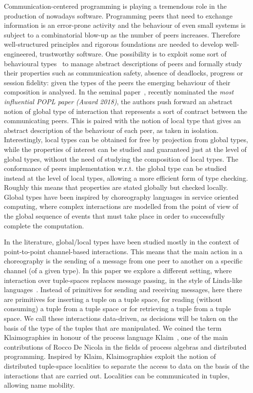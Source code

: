 
Communication-centered programming is playing a tremendous role in the production of nowadays software. Programming peers that need to exchange information is an error-prone activity and the behaviour of even small systems is subject to a combinatorial blow-up as the number of peers increases.
Therefore well-structured principles and rigorous foundations are needed to develop well-engineered, trustworthy software. 
One possibility is to exploit some sort of behavioural types~\cite{DBLP:journals/csur/HuttelLVCCDMPRT16,dd09} to manage abstract descriptions of peers and formally study their properties such as communication safety, absence of deadlocks, progress or session fidelity: given the types of the peers the emerging behaviour of their composition is analysed.
In the seminal paper~\cite{DBLP:conf/popl/HondaYC08}, recently nominated the \emph{most influential POPL paper (Award 2018)}, the authors push forward an abstract notion of global type of interaction that represents a sort of contract between the communicating peers. This is paired with the notion of local type that gives an abstract description of the behaviour of each peer, as taken in isolation.
Interestingly, local types can be obtained for free by projection from global types, while the properties of interest can be studied and guaranteed just at the level of global types, without the need of studying the composition of local types. The conformance of peers implementation w.r.t. the global type can be studied instead at the level of local types, allowing a more efficient form of type checking. Roughly this means that properties are stated globally but checked locally. Global types have been inspired by choreography languages in service oriented computing, where complex interactions are modelled from the point of view of the global sequence of events that must take place in order to successfully complete the computation.

In the literature, global/local types have been studied mostly in the
context of point-to-point channel-based interactions. This means that
the main action in a choreography is the sending of a message from one
peer to another on a specific channel (of a given type). In this paper we
explore a different setting, where interaction over tuple-spaces
replaces message passing, in the style of Linda-like
languages~\cite{DBLP:journals/toplas/Gelernter85}.  Instead of
primitives for sending and receiving messages, here there are
primitives for inserting a tuple on a tuple space, for reading
(without consuming) a tuple from a tuple space or for retrieving a
tuple from a tuple space. We call these interactions data-driven, as
decisions will be taken on the basis of the type of the tuples that
are manipulated. We coined the term Klaimographies in honour of the
process language Klaim~\cite{DBLP:journals/tse/NicolaFP98,klaim}, one
of the main contributions of Rocco De Nicola in the fields of process
algebras and distributed programming. Inspired by Klaim,
Klaimographies exploit the notion of distributed tuple-space
localities to separate the access to data on the basis of the
interactions that are carried out. Localities can be communicated in
tuples, allowing name mobility.

